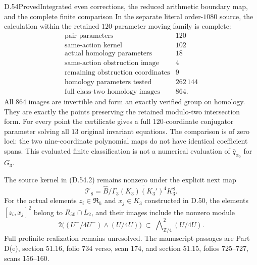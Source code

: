 \begin{statement}{D.54}{Proved}{Integrated even corrections, the reduced arithmetic boundary map, and the complete finite comparison}
In the separate literal order-\(1080\)
source, the calculation within the retained
\(120\)-parameter moving family is complete:
\[
 \begin{array}{c|r}
 \text{pair parameters}&120\\
 \text{same-action kernel}&102\\
 \text{actual homology parameters}&18\\
 \text{same-action obstruction image}&4\\
 \text{remaining obstruction coordinates}&9\\
 \text{homology parameters tested}&262\,144\\
 \text{full class-two homology images}&864 .
 \end{array}
 \tag{D.54.10}
\]
All \(864\) images are invertible and form
an exactly verified group on homology.
They are exactly the points preserving
the retained modulo-two intersection form.
For every point the certificate gives a
full \(120\)-coordinate conjugator parameter
solving all \(13\) original invariant
equations. The comparison is of zero loci:
the two nine-coordinate polynomial maps
do not have identical coefficient spans.
This evaluated finite classification is
not a numerical evaluation of
\(\overline q_{\alpha_0}\) for \(G_3\).

The source kernel in (D.54.2) remains
nonzero under the explicit next map
\[
 \mathcal T_8=
 \widehat B/
   \overline{\Gamma_3(K_3)(K_3')^4K_3^8}.
 \tag{D.54.11}
\]
For the actual elements \(z_i\in\mathfrak R_h\)
and \(x_j\in K_3\) constructed in D.50,
the elements \([z_i,x_j]^2\) belong to
\(R_{50}\cap L_2\), and their images include
the nonzero module
\[
        2\bigl((U^-/4U^-)\wedge(U/4U)\bigr)
       \ \subset\ \bigwedge\nolimits^2_{\mathbb Z/4}(U/4U).
 \tag{D.54.12}
\]
Full profinite realization remains unresolved.
The manuscript passages are Part D(e),
section 51.16, folio 734 verso, scan 174,
and section 51.15, folios 725--727,
scans 156--160.
\end{statement}
